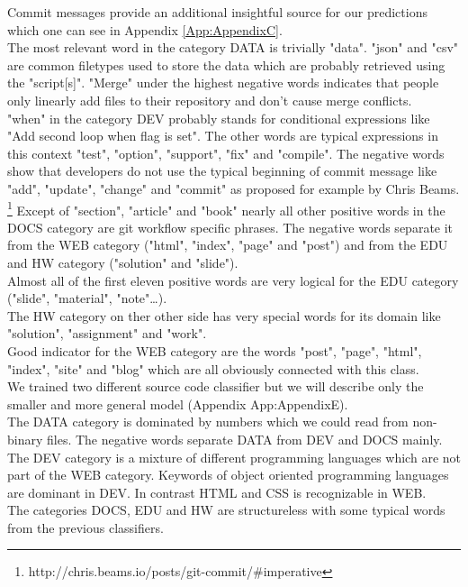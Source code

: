\documentclass[%
a4paper,
DIV12,
2.5headlines,
bigheadings,
titlepage,
openbib,
]{scrartcl}
\begin{document}
Commit messages provide an additional insightful source for our predictions which one can see in Appendix \ref{App:AppendixC}.\\
The most relevant word in the category DATA is trivially "data". 
"json" and "csv" are common filetypes used to store the data which are probably retrieved using the "script[s]".
"Merge" under the highest negative words indicates that people only linearly add files to their repository and don't cause merge conflicts.\\
"when" in the category DEV probably stands for conditional expressions like "Add second loop when flag is set".
The other words are typical expressions in this context "test", "option", "support", "fix" and "compile".
The negative words show that developers do not use the typical beginning of commit message like "add", "update", "change" and "commit" as proposed for example by Chris Beams.\\ \footnote{http://chris.beams.io/posts/git-commit/\#imperative}
Except of "section", "article" and "book" nearly all other positive words in the DOCS category are git workflow specific phrases.
The negative words separate it from the WEB category ("html", "index", "page" and "post") and from the EDU and HW category ("solution" and "slide").\\
Almost all of the first eleven positive words are very logical for the EDU category ("slide", "material", "note"\dots).\\
The HW category on ther other side has very special words for its domain like "solution", "assignment" and "work".\\
Good indicator for the WEB category are the words "post", "page", "html", "index", "site" and "blog" which are all obviously connected with this class.\\

We trained two different source code classifier but we will describe only the smaller and more general model (Appendix App:AppendixE).\\
The DATA category is dominated by numbers which we could read from non-binary files.
The negative words separate DATA from DEV and DOCS mainly.\\
The DEV category is a mixture of different programming languages which are not part of the WEB category.
Keywords of object oriented programming languages are dominant in DEV.
In contrast HTML and CSS is recognizable in WEB.\\
The categories DOCS, EDU and HW are structureless with some typical words from the previous classifiers. 
\end{document}
